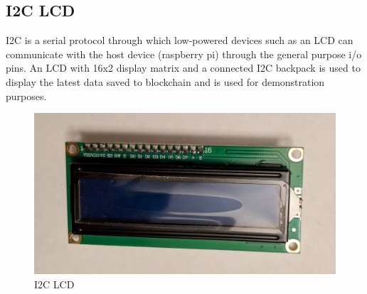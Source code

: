 \documentclass[11pt,openright]{report}
\begin{document}
\subsection{I2C LCD}
I2C is a serial protocol through which low-powered devices such as an LCD can communicate with the host device (raspberry pi) through the general purpose i/o pins. 
An LCD with 16x2 display matrix and a connected I2C backpack is used to display the latest data saved to blockchain and is used for demonstration purposes.
\newline
\newline
\begin{figure}[!htbp]
    \centering
    \includegraphics[scale=0.1]{images/i2c_lcd.jpg}
    \caption{I2C LCD}
    \label{fig:i2c_lcd}
\end{figure}
\newline
\newline
\end{document}
